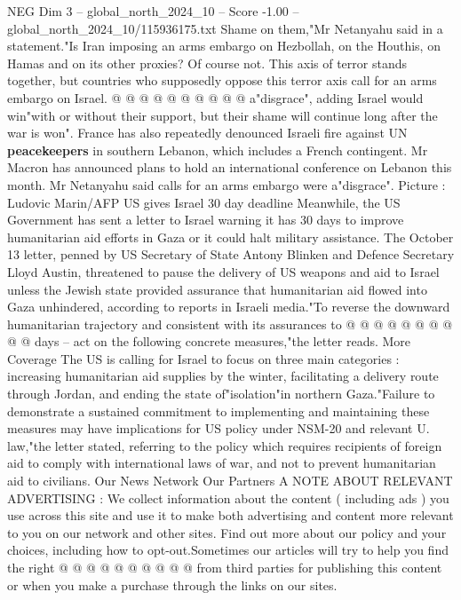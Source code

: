 \begin{textsample}{NEG Dim 3 – global\_north\_2024\_10 – Score -1.00 – global\_north\_2024\_10/115936175.txt}
Shame on them,"Mr Netanyahu said in a statement."Is Iran imposing an arms embargo on Hezbollah, on the Houthis, on Hamas and on its other proxies?
Of course not.
This axis of terror stands together, but countries who supposedly oppose this terror axis call for an arms embargo on Israel. @ @ @ @ @ @ @ @ @ @ a"disgrace", adding Israel would win"with or without their support, but their shame will continue long after the war is won".
France has also repeatedly denounced Israeli fire against UN \textbf{peacekeepers} in southern Lebanon, which includes a French contingent.
Mr Macron has announced plans to hold an international conference on Lebanon this month.
Mr Netanyahu said calls for an arms embargo were a"disgrace".
Picture : Ludovic Marin/AFP US gives Israel 30 day deadline Meanwhile, the US Government has sent a letter to Israel warning it has 30 days to improve humanitarian aid efforts in Gaza or it could halt military assistance.
The October 13 letter, penned by US Secretary of State Antony Blinken and Defence Secretary Lloyd Austin, threatened to pause the delivery of US weapons and aid to Israel unless the Jewish state provided assurance that humanitarian aid flowed into Gaza unhindered, according to reports in Israeli media."To reverse the downward humanitarian trajectory and consistent with its assurances to @ @ @ @ @ @ @ @ @ @ days -- act on the following concrete measures,"the letter reads.
More Coverage The US is calling for Israel to focus on three main categories : increasing humanitarian aid supplies by the winter, facilitating a delivery route through Jordan, and ending the state of"isolation"in northern Gaza."Failure to demonstrate a sustained commitment to implementing and maintaining these measures may have implications for US policy under NSM-20 and relevant U. law,"the letter stated, referring to the policy which requires recipients of foreign aid to comply with international laws of war, and not to prevent humanitarian aid to civilians.
Our News Network Our Partners A NOTE ABOUT RELEVANT ADVERTISING : We collect information about the content ( including ads ) you use across this site and use it to make both advertising and content more relevant to you on our network and other sites.
Find out more about our policy and your choices, including how to opt-out.Sometimes our articles will try to help you find the right @ @ @ @ @ @ @ @ @ @ from third parties for publishing this content or when you make a purchase through the links on our sites.

\end{textsample}

